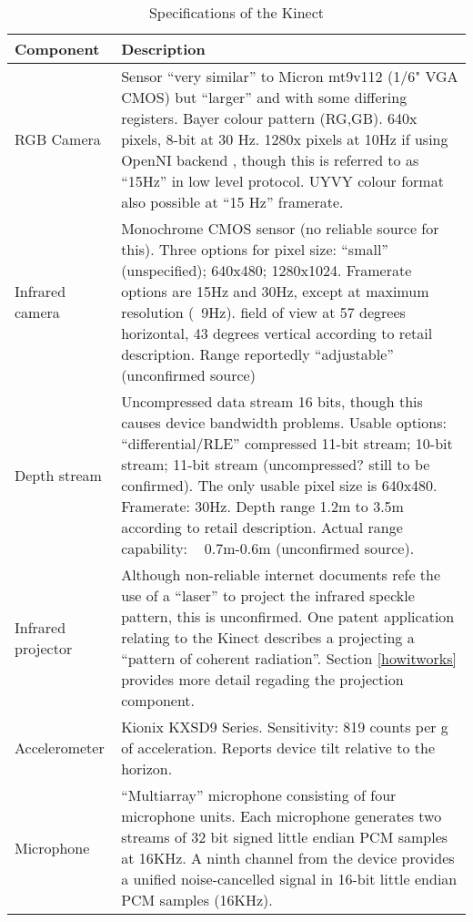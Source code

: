 \begin{table}[ht]
\centering
\begin{tabular}{l p{10cm}}
\toprule
Component & Description \\
\midrule

RGB Camera & Sensor ``very similar'' to Mi\-cron mt9v112 (1/6" VGA CMOS) but
``larger'' and with some di\-ffering reg\-isters. Bay\-er co\-lour pa\-ttern (RG,GB).
640x\-480 pixels, 8-bit at 30 Hz.  1280x\-1024 pixels at 10\-Hz if using Open\-NI backend
, though this is referred to as ``15Hz'' in low level pro\-tocol. UYVY co\-lour
for\-mat also possible at ``15 Hz'' framerate.\cite{FREENECT}\cite{RGBDEMO} \\

Infrared camera & Monochrome CMOS sensor (no reliable source for this). Three
options for pixel size: ``small'' (unspecified); 640x480; 1280x1024. Framerate
options are 15Hz and 30Hz, except at maximum resolution (~9Hz).\cite{FREENECT}
field of view at 57 degrees horizontal, 43 degrees vertical according to retail
description.\cite{PLAY} Range reportedly ``adjustable'' (unconfirmed source) \\ 

Depth stream & Uncompressed data stream 16 bits, though this causes device
bandwidth problems. Usable options: ``differential/RLE'' compressed 11-bit
stream; 10-bit stream; 11-bit stream (uncompressed? still to be confirmed). The
only usable pixel size is 640x480. Framerate: 30Hz. \cite{FREENECT} Depth range
1.2m to 3.5m according to retail description.\cite{PLAY} Actual range
capability: ~ 0.7m-0.6m (unconfirmed source).\\

Infrared projector & Although non-reliable internet documents refe the use of a
``laser'' to project the infrared speckle pattern, this is unconfirmed. One
patent application relating to the Kinect describes a projecting a ``pattern of
coherent radiation''.\cite{SHPUNT:2010-1} Section \ref{howitworks} provides more
detail regading the projection component. \\

Accelerometer & Kionix KXSD9 Series. Sensitivity: 819 counts per g of
acceleration. Reports device tilt relative to the
horizon.\cite{FREENECT}\cite{KIONIX}\\

Microphone & ``Multiarray'' microphone consisting of four microphone units. Each
microphone generates two streams of 32 bit signed little endian PCM samples at
16KHz. A ninth channel from the device provides a unified noise-cancelled signal
in 16-bit little endian PCM samples (16KHz).\cite{FREENECT}\\

\bottomrule
\end{tabular}
\caption{Specifications of the Kinect}
\label{tab:specs}
\end{table}


